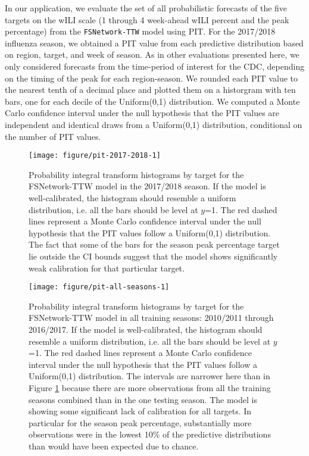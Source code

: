 \documentclass{article}\usepackage[]{graphicx}\usepackage[]{color}
\makeatletter
\def\maxwidth{ %
  \ifdim\Gin@nat@width>\linewidth
    \linewidth
  \else
    \Gin@nat@width
  \fi
}
\newenvironment{knitrout}{}{} %
\makeatother
\begin{document}
In our application, we evaluate the set of all probabilistic forecasts of the five targets on the wILI scale (1 through 4 week-ahead wILI percent and the peak percentage) from the {\tt FSNetwork-TTW} model using PIT. For the 2017/2018 influenza season, we obtained a PIT value from each predictive distribution based on region, target, and week of season. 
As in other evaluations presented here, we only considered forecasts from the time-period of interest for the CDC, depending on the timing of the peak for each region-season.
We rounded each PIT value to the nearest tenth of a decimal place and plotted them on a historgram with ten bars, one for each decile of the Uniform(0,1) distribution.
We computed a Monte Carlo confidence interval under the null hypothesis that the PIT values are independent and identical draws from a Uniform(0,1) distribution, conditional on the number of PIT values. 

\begin{knitrout}
\color{fgcolor}\begin{figure}
\texttt{[image: figure/pit-2017-2018-1]} \caption[Probability integral transform histograms by target for the FSNetwork-TTW model in the 2017/2018 season]{Probability integral transform histograms by target for the FSNetwork-TTW model in the 2017/2018 season. If the model is well-calibrated, the histogram should resemble a uniform distribution, i.e. all the bars should be level at $y$=1. The red dashed lines represent a Monte Carlo confidence interval under the null hypothesis that the PIT values follow a Uniform(0,1) distribution. The fact that some of the bars for the season peak percentage target lie outside the CI bounds suggest that the model shows significantly weak calibration for that particular target.}\label{fig:pit-2017-2018}
\end{figure}


\end{knitrout}


\begin{knitrout}
\color{fgcolor}\begin{figure}
\texttt{[image: figure/pit-all-seasons-1]} \caption{Probability integral transform histograms by target for the FSNetwork-TTW model in all training seasons: 2010/2011 through 2016/2017. If the model is well-calibrated, the histogram should resemble a uniform distribution, i.e. all the bars should be level at $y$=1. The red dashed lines represent a Monte Carlo confidence interval under the null hypothesis that the PIT values follow a Uniform(0,1) distribution. The intervals are narrower here than in Figure \ref{fig:pit-2017-2018} because there are more observations from all the training seasons combined than in the one testing season. The model is showing some significant lack of calibration for all targets. In particular for the season peak percentage, substantially more observations were in the lowest 10\% of the predictive distributions than would have been expected due to chance.}\label{fig:pit-all-seasons}
\end{figure}


\end{knitrout}
\end{document}
